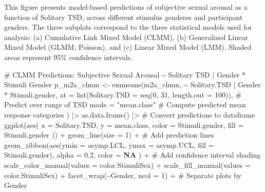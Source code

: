 \documentclass[
  bookmarksnumbered]{article}
\newenvironment{Shaded}{\begin{snugshade}}{\end{snugshade}}
\newcommand{\AttributeTok}[1]{\textcolor[rgb]{0.80,0.80,0.80}{#1}}
\newcommand{\CommentTok}[1]{\textcolor[rgb]{0.50,0.62,0.50}{#1}}
\newcommand{\ConstantTok}[1]{\textcolor[rgb]{0.86,0.64,0.64}{\textbf{#1}}}
\newcommand{\DecValTok}[1]{\textcolor[rgb]{0.86,0.86,0.80}{#1}}
\newcommand{\FloatTok}[1]{\textcolor[rgb]{0.75,0.75,0.82}{#1}}
\newcommand{\FunctionTok}[1]{\textcolor[rgb]{0.94,0.94,0.56}{#1}}
\newcommand{\NormalTok}[1]{\textcolor[rgb]{0.80,0.80,0.80}{#1}}
\newcommand{\OtherTok}[1]{\textcolor[rgb]{0.94,0.94,0.56}{#1}}
\newcommand{\SpecialCharTok}[1]{\textcolor[rgb]{0.86,0.64,0.64}{#1}}
\newcommand{\StringTok}[1]{\textcolor[rgb]{0.80,0.58,0.58}{#1}}
\begin{document}
This figure presents model-based predictions of subjective sexual arousal as a function of Solitary TSD, across different stimulus genderes and participant genders. The three subplots correspond to the three statistical models used for analysis: (a) Cumulative Link Mixed Model (CLMM), (b) Generalized Linear Mixed Model (GLMM, Poisson), and (c) Linear Mixed Model (LMM). Shaded areas represent 95\% confidence intervals.

\begin{Shaded}
\begin{Highlighting}[]
\CommentTok{\# CLMM Predictions: Subjective Sexual Arousal \textasciitilde{} Solitary TSD | Gender * Stimuli Gender}
\NormalTok{p\_m2a\_clmm }\OtherTok{\textless{}{-}} \FunctionTok{emmeans}\NormalTok{(m2a\_clmm, }\SpecialCharTok{\textasciitilde{}}\NormalTok{ Solitary.TSD }\SpecialCharTok{|}\NormalTok{ Gender }\SpecialCharTok{*}\NormalTok{ Stimuli.gender,}
  \AttributeTok{at =} \FunctionTok{list}\NormalTok{(}\AttributeTok{Solitary.TSD =} \FunctionTok{seq}\NormalTok{(}\DecValTok{0}\NormalTok{, }\DecValTok{31}\NormalTok{, }\AttributeTok{length.out =} \DecValTok{100}\NormalTok{)), }\CommentTok{\# Predict over range of TSD}
  \AttributeTok{mode =} \StringTok{"mean.class"} \CommentTok{\# Compute predicted mean response categories}
\NormalTok{) }\SpecialCharTok{|\textgreater{}}
  \FunctionTok{as.data.frame}\NormalTok{() }\SpecialCharTok{|\textgreater{}} \CommentTok{\# Convert predictions to dataframe}
  \FunctionTok{ggplot}\NormalTok{(}\FunctionTok{aes}\NormalTok{(}
    \AttributeTok{x =}\NormalTok{ Solitary.TSD, }\AttributeTok{y =}\NormalTok{ mean.class,}
    \AttributeTok{color =}\NormalTok{ Stimuli.gender, }\AttributeTok{fill =}\NormalTok{ Stimuli.gender}
\NormalTok{  )) }\SpecialCharTok{+}
  \FunctionTok{geom\_line}\NormalTok{(}\AttributeTok{size =} \DecValTok{1}\NormalTok{) }\SpecialCharTok{+} \CommentTok{\# Add prediction lines}
  \FunctionTok{geom\_ribbon}\NormalTok{(}\FunctionTok{aes}\NormalTok{(}\AttributeTok{ymin =}\NormalTok{ asymp.LCL, }\AttributeTok{ymax =}\NormalTok{ asymp.UCL, }\AttributeTok{fill =}\NormalTok{ Stimuli.gender),}
    \AttributeTok{alpha =} \FloatTok{0.2}\NormalTok{, }\AttributeTok{color =} \ConstantTok{NA}
\NormalTok{  ) }\SpecialCharTok{+} \CommentTok{\# Add confidence interval shading}
  \FunctionTok{scale\_color\_manual}\NormalTok{(}\AttributeTok{values =}\NormalTok{ color.StimuliSex) }\SpecialCharTok{+}
  \FunctionTok{scale\_fill\_manual}\NormalTok{(}\AttributeTok{values =}\NormalTok{ color.StimuliSex) }\SpecialCharTok{+}
  \FunctionTok{facet\_wrap}\NormalTok{(}\SpecialCharTok{\textasciitilde{}}\NormalTok{Gender, }\AttributeTok{ncol =} \DecValTok{1}\NormalTok{) }\SpecialCharTok{+} \CommentTok{\# Separate plots by Gender}

\end{Highlighting}
\end{Shaded}
\end{document}
